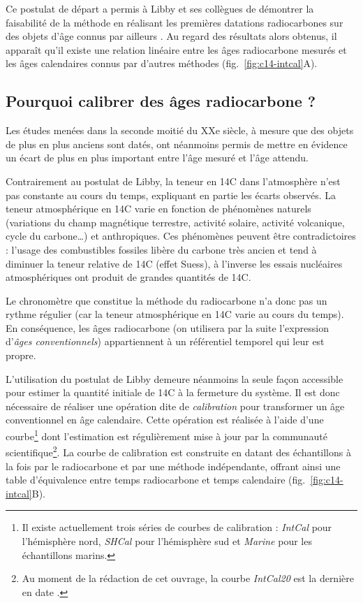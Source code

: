 \documentclass[
  french,
]{scrbook}
\begin{document}
Ce postulat de départ a permis à Libby et ses collègues de démontrer la faisabilité de la méthode en réalisant les premières datations radiocarbones sur des objets d'âge connus par ailleurs \autocite{arnold1949,libby1949,libby1960}. Au regard des résultats alors obtenus, il apparaît qu'il existe une relation linéaire entre les âges radiocarbone mesurés et les âges calendaires connus par d'autres méthodes (fig.~\ref{fig:c14-intcal}A).

\hypertarget{pourquoi-calibrer-des-uxe2ges-radiocarbone}{%
\subsection{Pourquoi calibrer des âges radiocarbone ?}\label{pourquoi-calibrer-des-uxe2ges-radiocarbone}}

Les études menées dans la seconde moitié du XXe siècle, à mesure que des objets de plus en plus anciens sont datés, ont néanmoins permis de mettre en évidence un écart de plus en plus important entre l'âge mesuré et l'âge attendu.

Contrairement au postulat de Libby, la teneur en 14C dans l'atmosphère n'est pas constante au cours du temps, expliquant en partie les écarts observés. La teneur atmosphérique en 14C varie en fonction de phénomènes naturels (variations du champ magnétique terrestre, activité solaire, activité volcanique, cycle du carbone\ldots) et anthropiques. Ces phénomènes peuvent être contradictoires : l'usage des combustibles fossiles libère du carbone très ancien et tend à diminuer la teneur relative de 14C (effet Suess), à l'inverse les essais nucléaires atmosphériques ont produit de grandes quantités de 14C.

Le chronomètre que constitue la méthode du radiocarbone n'a donc pas un rythme régulier (car la teneur atmosphérique en 14C varie au cours du temps). En conséquence, les âges radiocarbone (on utilisera par la suite l'expression d'\emph{âges conventionnels}) appartiennent à un référentiel temporel qui leur est propre.

L'utilisation du postulat de Libby demeure néanmoins la seule façon accessible pour estimer la quantité initiale de 14C à la fermeture du système. Il est donc nécessaire de réaliser une opération dite de \emph{calibration} pour transformer un âge conventionnel en âge calendaire. Cette opération est réalisée à l'aide d'une courbe\footnote{Il existe actuellement trois séries de courbes de calibration : \emph{IntCal} pour l'hémisphère nord, \emph{SHCal} pour l'hémisphère sud et \emph{Marine} pour les échantillons marins.} dont l'estimation est régulièrement mise à jour par la communauté scientifique\footnote{Au moment de la rédaction de cet ouvrage, la courbe \emph{IntCal20} est la dernière en date \autocite{reimer2009,reimer2013,reimer2020}.}. La courbe de calibration est construite en datant des échantillons à la fois par le radiocarbone et par une méthode indépendante, offrant ainsi une table d'équivalence entre temps radiocarbone et temps calendaire (fig.~\ref{fig:c14-intcal}B).
\end{document}
